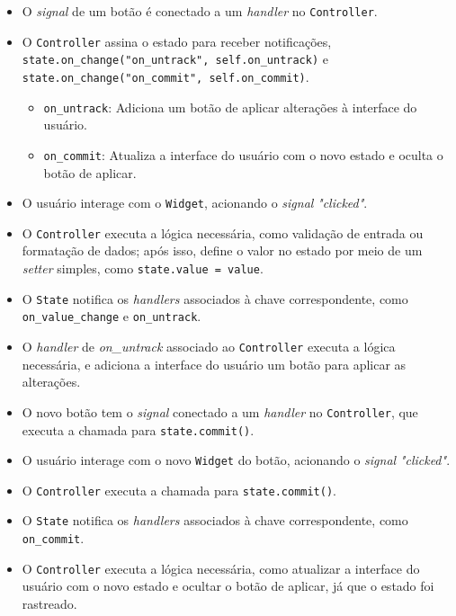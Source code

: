 \begin{itemize}
    \item O \textit{signal} de um botão é conectado a um \textit{handler} no \texttt{Controller}.

    \item O \texttt{Controller} assina o estado para receber notificações, \texttt{state.on\_change("on\_untrack", self.on\_untrack)} e \texttt{state.on\_change("on\_commit", self.on\_commit)}.

    \begin{itemize}
        \item \texttt{on\_untrack}: Adiciona um botão de aplicar alterações à interface do usuário.
        \item \texttt{on\_commit}: Atualiza a interface do usuário com o novo estado e oculta o botão de aplicar.
    \end{itemize}

    \item O usuário interage com o \texttt{Widget}, acionando o \textit{signal} \textit{"clicked"}.

    \item O \texttt{Controller} executa a lógica necessária, como validação de entrada ou formatação de dados; após isso, define o valor no estado por meio de um \textit{setter} simples, como \texttt{state.value = value}.

    \item O \texttt{State} notifica os \textit{handlers} associados à chave correspondente, como \texttt{on\_value\_change} e \texttt{on\_untrack}.

    \item O \textit{handler} de \textit{on\_untrack} associado ao \texttt{Controller} executa a lógica necessária, e adiciona a interface do usuário um botão para aplicar as alterações.

    \item O novo botão tem o \textit{signal} conectado a um \textit{handler} no \texttt{Controller}, que executa a chamada para \texttt{state.commit()}.

    \item O usuário interage com o novo \texttt{Widget} do botão, acionando o \textit{signal} \textit{"clicked"}.

    \item O \texttt{Controller} executa a chamada para \texttt{state.commit()}.

    \item O \texttt{State} notifica os \textit{handlers} associados à chave correspondente, como \texttt{on\_commit}.

    \item O \texttt{Controller} executa a lógica necessária, como atualizar a interface do usuário com o novo estado e ocultar o botão de aplicar, já que o estado foi rastreado.
\end{itemize}

